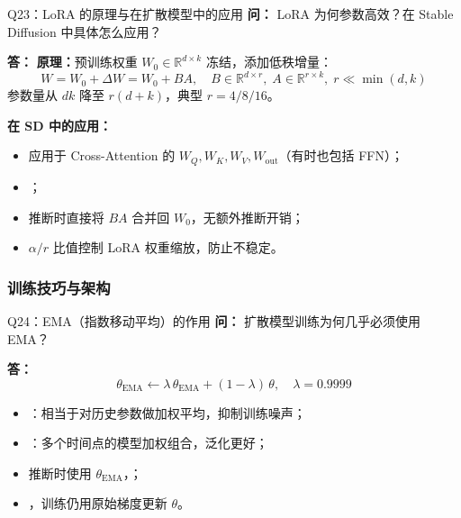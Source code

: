 \begin{conceptbox}{Q23：LoRA 的原理与在扩散模型中的应用}
\textbf{问：} LoRA 为何参数高效？在 Stable Diffusion 中具体怎么应用？

\textbf{答：}
\textbf{原理：}预训练权重 $W_0\in\mathbb{R}^{d\times k}$ 冻结，添加低秩增量：
\[
  W = W_0 + \Delta W = W_0 + BA, \quad B\in\mathbb{R}^{d\times r},\;A\in\mathbb{R}^{r\times k},\;r\ll\min(d,k)
\]
参数量从 $dk$ 降至 $r(d+k)$，典型 $r=4/8/16$。

\textbf{在 SD 中的应用：}
\begin{itemize}
  \item 应用于 Cross-Attention 的 $W_Q, W_K, W_V, W_{\text{out}}$（有时也包括 FFN）；
  \item {}；
  \item 推断时直接将 $BA$ 合并回 $W_0$，无额外推断开销；
  \item $\alpha/r$ 比值控制 LoRA 权重缩放，防止不稳定。
\end{itemize}
\end{conceptbox}

\subsubsection{训练技巧与架构}

\begin{conceptbox}{Q24：EMA（指数移动平均）的作用}
\textbf{问：} 扩散模型训练为何几乎必须使用 EMA？

\textbf{答：}
\[
  \theta_{\text{EMA}} \leftarrow \lambda\,\theta_{\text{EMA}} + (1-\lambda)\,\theta, \quad \lambda=0.9999
\]
\begin{itemize}
  \item {}：相当于对历史参数做加权平均，抑制训练噪声；
  \item {}：多个时间点的模型加权组合，泛化更好；
  \item 推断时使用 $\theta_{\text{EMA}}$，；
  \item {}，训练仍用原始梯度更新 $\theta$。
\end{itemize}
\end{conceptbox}

